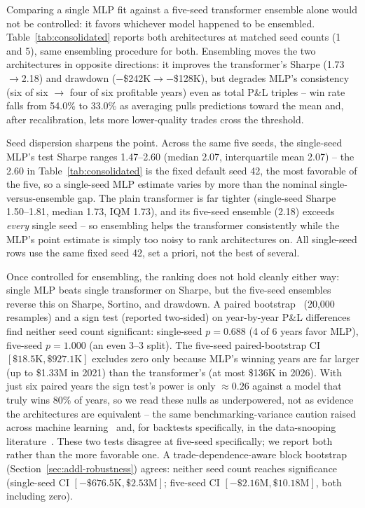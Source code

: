 \documentclass[sigconf,review]{acmart}
\begin{document}
Comparing a single MLP fit against a five-seed transformer ensemble alone would not be controlled: it favors whichever model happened to be ensembled. Table~\ref{tab:consolidated} reports both architectures at matched seed counts (1 and 5), same ensembling procedure for both. Ensembling moves the two architectures in opposite directions: it improves the transformer's Sharpe (1.73$\to$2.18) and drawdown ($-$\$242K$\to-$\$128K), but degrades MLP's consistency (six of six $\to$ four of six profitable years) even as total P\&L triples -- win rate falls from 54.0\% to 33.0\% as averaging pulls predictions toward the mean and, after recalibration, lets more lower-quality trades cross the threshold.

Seed dispersion sharpens the point. Across the same five seeds, the single-seed MLP's test Sharpe ranges 1.47--2.60 (median 2.07, interquartile mean 2.07) -- the 2.60 in Table~\ref{tab:consolidated} is the fixed default seed 42, the most favorable of the five, so a single-seed MLP estimate varies by more than the nominal single-versus-ensemble gap. The plain transformer is far tighter (single-seed Sharpe 1.50--1.81, median 1.73, IQM 1.73), and its five-seed ensemble (2.18) exceeds \emph{every} single seed -- so ensembling helps the transformer consistently while the MLP's point estimate is simply too noisy to rank architectures on. All single-seed rows use the same fixed seed 42, set a priori, not the best of several.

Once controlled for ensembling, the ranking does not hold cleanly either way: single MLP beats single transformer on Sharpe, but the five-seed ensembles reverse this on Sharpe, Sortino, and drawdown. A paired bootstrap~\cite{efron1993bootstrap} (20{,}000 resamples) and a sign test (reported two-sided) on year-by-year P\&L differences find neither seed count significant: single-seed $p=0.688$ (4 of 6 years favor MLP), five-seed $p=1.000$ (an even 3--3 split). The five-seed paired-bootstrap CI $[\$18.5\text{K}, \$927.1\text{K}]$ excludes zero only because MLP's winning years are far larger (up to \$1.33M in 2021) than the transformer's (at most \$136K in 2026). With just six paired years the sign test's power is only $\approx0.26$ against a model that truly wins 80\% of years, so we read these nulls as underpowered, not as evidence the architectures are equivalent -- the same benchmarking-variance caution raised across machine learning~\cite{bouthillier2021accounting,dodge2019show,agarwal2021deep,melis2018state,lucic2018gans} and, for backtests specifically, in the data-snooping literature~\cite{white2000reality,hansen2005spa,harvey2016crosssection}. These two tests disagree at five-seed specifically; we report both rather than the more favorable one. A trade-dependence-aware block bootstrap~\cite{kunsch1989} (Section~\ref{sec:addl-robustness}) agrees: neither seed count reaches significance (single-seed CI $[-\$676.5\text{K}, \$2.53\text{M}]$; five-seed CI $[-\$2.16\text{M}, \$10.18\text{M}]$, both including zero).
\end{document}
